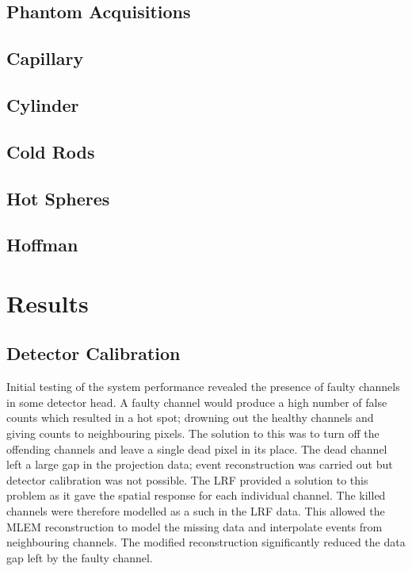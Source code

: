 \subsection{Phantom Acquisitions}
\subsection{Capillary}
\subsection{Cylinder}
\subsection{Cold Rods}
\subsection{Hot Spheres} 
\subsection{Hoffman}

\section{Results}
\subsection{Detector Calibration}
Initial testing of the system performance revealed the presence of faulty channels in some detector head. A faulty channel would produce a high number of false counts which resulted in a hot spot; drowning out the healthy channels and giving counts to neighbouring pixels. The solution to this was to turn off the offending channels and leave a single dead pixel in its place. The dead channel left a large gap in the projection data; event reconstruction was carried out but detector calibration was not possible. The \acrshort{LRF} provided a solution to this problem as it gave the spatial response for each individual channel. The killed channels were therefore modelled as a such in the \acrshort{LRF} data. This allowed the \acrshort{MLEM} reconstruction to model the missing data and interpolate events from neighbouring channels. The modified reconstruction significantly reduced the data gap left by the faulty channel. 

